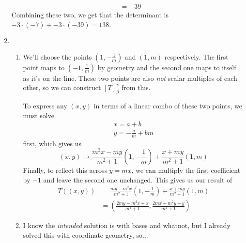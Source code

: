 \documentclass[12pt]{article}
\begin{document}
\begin{enumerate}
\begin{align*}
                                       & = -39
            \end{align*}
            Combining these two, we get that the determinant is $-3 \cdot (-7) + -3 \cdot (-39)=\boxed{138}$.
      \item \begin{enumerate}
                  \item We'll choose the points $\left(1, -\frac{1}{m}\right)$ and $(1, m)$ respectively.
                        The first point maps to $\left(-1, \frac{1}{m}\right)$ by geometry and the second one maps to itself as it's on the line.
                        These two points are also \textit{not} scalar multiples of each other, so we can construct $[T]^\gamma_\beta$ from this.

                        To express any $(x,y)$ in terms of a linear combo of these two points, we must solve
                        \begin{gather*}
                              x=a+b \\
                              y=-\frac{a}{m}+bm
                        \end{gather*}
                        first, which gives us
                        \[(x,y) \rightarrow \frac{m^2x-my}{m^2+1}\left(1, -\frac{1}{m}\right)+\frac{x+my}{m^2+1}(1, m)\]
                        Finally, to reflect this across $y=mx$, we can multiply the first coefficient by $-1$ and leave the second one unchanged.
                        This gives us our result of
                        \begin{align*}
                              T((x,y)) & =\frac{my-m^2x}{m^2+1}\left(1, -\frac{1}{m}\right)+\frac{x+my}{m^2+1}(1, m) \\
                                       & = \boxed{\left(\frac{2my-m^2x+x}{m^2+1}, \frac{2mx+m^2y-y}{m^2+1}\right)}
                        \end{align*}
                  \item I know the \textit{intended} solution is with bases and whatnot,
                        but I already solved this with coordinate geometry, so...


\end{enumerate}
\end{enumerate}
\end{document}
